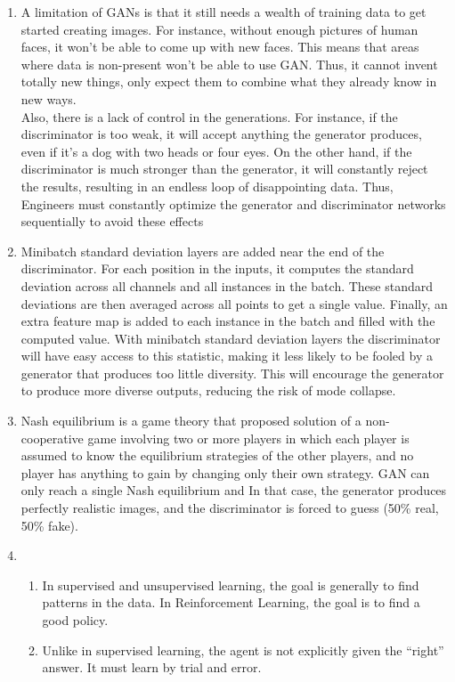 \documentclass[12pt]{article}
\begin{document}
\begin{enumerate}
\item A limitation of GANs is that it still needs a wealth of training data to get started creating images. For instance, without enough pictures of human faces, it won’t be able to come up with new faces. This means that areas where data is non-present won’t be able to use GAN. Thus, it cannot invent totally new things, only expect them to combine what they already know in new ways.\\
Also, there is a lack of control in the generations. For instance, if the discriminator is too weak, it will accept anything the generator produces, even if it’s a dog with two heads or four eyes. On the other hand, if the discriminator is much stronger than the generator, it will constantly reject the results, resulting in an endless loop of disappointing data. Thus, Engineers must constantly optimize the generator and discriminator networks sequentially to avoid these effects 
\item Minibatch standard deviation layers are added near the end of the discriminator. For each position in the inputs, it computes the standard deviation across all channels and all instances in the batch. These standard deviations are then averaged across all points to get a single value. Finally, an extra feature map is added to each instance in the batch and filled with the computed value.
With minibatch standard deviation layers the discriminator will have easy access to this statistic, making it less likely to be fooled by a generator that produces too little diversity. This will encourage the generator to produce more diverse outputs, reducing the risk of mode collapse.
\item Nash equilibrium is a game theory that proposed solution of a non-cooperative game involving two or more players in which each player is assumed to know the equilibrium strategies of the other players, and no player has anything to gain by changing only their own strategy.
GAN can only reach a single Nash equilibrium and In that case, the generator produces perfectly realistic images, and the discriminator is forced to guess (50\% real, 50\% fake).
\item 
\begin{enumerate}
	\item In supervised and unsupervised learning, the goal is generally to find patterns in the data. In Reinforcement Learning, the goal is to find a good policy.
	\item Unlike in supervised learning, the agent is not explicitly given the “right” answer. It must learn by trial and error.

\end{enumerate}
\end{enumerate}
\end{document}
